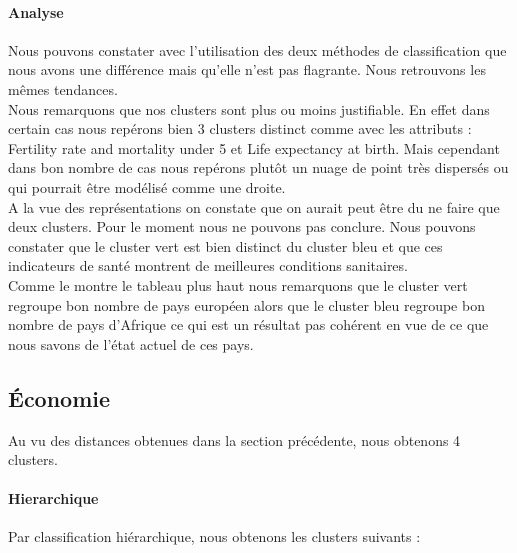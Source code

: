 \paragraph{Analyse}
Nous pouvons constater avec l'utilisation des deux méthodes de classification que nous avons une différence mais qu'elle n'est pas flagrante. Nous retrouvons les mêmes tendances.\\
Nous remarquons que nos clusters sont plus ou moins justifiable. En effet dans certain cas nous repérons bien 3 clusters distinct comme avec les attributs : Fertility rate and mortality under 5 et Life expectancy at birth. Mais cependant dans bon nombre de cas nous repérons plutôt un nuage de point très dispersés ou qui pourrait être modélisé comme une droite.\\
A la vue des représentations on constate que on aurait peut être du ne faire que deux clusters. Pour le moment nous ne pouvons pas conclure. Nous pouvons constater que le cluster vert est bien distinct du cluster bleu et que ces indicateurs de santé montrent de meilleures conditions  sanitaires.\\
Comme le montre le tableau plus haut nous remarquons que le cluster vert regroupe bon nombre de pays européen alors que le cluster bleu regroupe bon nombre de pays d'Afrique ce qui est un résultat pas cohérent en vue de ce que nous savons de l'état actuel de ces pays.


\subsection{Économie}
Au vu des distances obtenues dans la section précédente, nous obtenons 4 clusters.

\paragraph{Hierarchique} Par classification hiérarchique, nous obtenons les clusters suivants :

